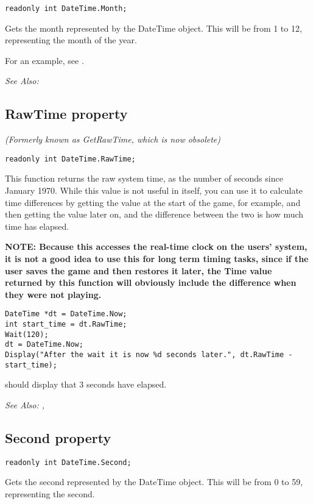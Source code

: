 \begin{verbatim}
readonly int DateTime.Month;
\end{verbatim}
Gets the month represented by the DateTime object. This will be from 1 to 12,
representing the month of the year.

For an example, see .

\it{See Also:} 


\subsection{RawTime property}\label{DateTime.RawTime}%

\it{(Formerly known as GetRawTime, which is now obsolete)}

\begin{verbatim}
readonly int DateTime.RawTime;
\end{verbatim}
This function returns the raw system time, as the number of seconds since January 1970.
While this value is not useful in itself, you can use it to calculate time differences
by getting the value at the start of the game, for example, and then getting the value
later on, and the difference between the two is how much time has elapsed.

\bf{NOTE:} Because this accesses the real-time clock on the users' system, it is not
a good idea to use this for long term timing tasks, since if the user saves the game and
then restores it later, the Time value returned by this function will obviously include
the difference when they were not playing.

\begin{verbatim}
DateTime *dt = DateTime.Now;
int start_time = dt.RawTime;
Wait(120);
dt = DateTime.Now;
Display("After the wait it is now %d seconds later.", dt.RawTime - start_time);
\end{verbatim}
should display that 3 seconds have elapsed.

\it{See Also:} , 


\subsection{Second property}\label{DateTime.Second}%

\begin{verbatim}
readonly int DateTime.Second;
\end{verbatim}
Gets the second represented by the DateTime object. This will be from 0 to 59,
representing the second.

